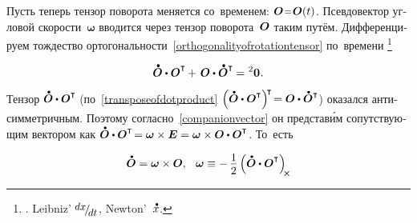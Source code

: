 \begin{otherlanguage}{russian}
Пусть теперь тензор поворота меняется со~временем:
${\rotationtensor \narroweq \rotationtensor(t)}$.
Псевдовектор угловой скорости~${\bm{\omega}}$ вводится через тензор поворота~$\bm{O}$ таким путём.
Дифференцируем тождество ортогональности~\eqref{orthogonalityofrotationtensor} по~времени%
\footnote{ .
  Leibniz’ ${\scalebox{.9}{$ \raisemath{.3em}{dx} $} \hspace{-0.3ex} / \hspace{-0.4ex} \scalebox{.9}{$ \raisemath{-.3em}{dt} $}\hspace{.1ex}}$,   Newton’~${\mathdotabove{x}}$.}

\nopagebreak\vspace{-0.1em}\begin{equation*}
\mathdotabove{\rotationtensor} \dotp \rotationtensor^{\T} \hspace{-0.1ex} + \hspace{.25ex} \rotationtensor \dotp \mathdotabove{\rotationtensor}^{\T} \hspace{-0.1ex} = \hspace{.1ex} {^2\bm{0}}
\hspace{.1ex} .
\end{equation*}

Тензор ${\mathdotabove{\rotationtensor} \dotp \rotationtensor^{\T\!}}$ (по~\eqref{transposeofdotproduct} ${\left({ \mathdotabove{\rotationtensor} \dotp \rotationtensor^{\T} }\right)^{\raisemath{-0.25em}{\!\T}} \hspace{-0.4ex} = \rotationtensor \dotp \mathdotabove{\rotationtensor}^{\T}}$) оказался анти\-сим\-метрич\-ным.
Поэтому согласно~\eqref{companionvector} он представ\'{и}м сопутствующим вектором как ${\mathdotabove{\rotationtensor} \dotp \rotationtensor^{\T\!} = \bm{\omega} \times \UnitDyad = \bm{\omega} \times \rotationtensor \dotp \rotationtensor^{\T}}$\!.
То~есть

\nopagebreak\vspace{-0.1em}\begin{equation}\label{angularvelocityvector}
\mathdotabove{\rotationtensor} = \bm{\omega} \times \rotationtensor, \;\:\:
\bm{\omega} \equiv -\, \displaystyle \onehalf \left( \mathdotabove{\rotationtensor} \dotp \rotationtensor^{\T} \right)_{\hspace{-0.2em}\Xcompanion}
\vspace{-0.25em}\end{equation}


\end{otherlanguage}
